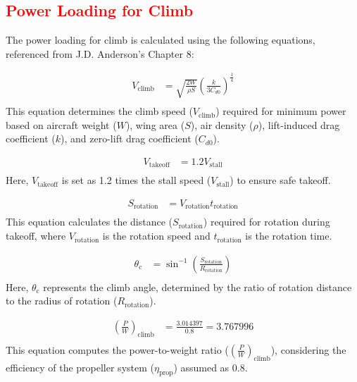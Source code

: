 \documentclass[12 pt]{article}
\begin{document}
\subsection{\textcolor{red}{Power Loading for Climb}}

The power loading for climb is calculated using the following equations, referenced from J.D. Anderson's Chapter 8:

\begin{align*}
V_{\text{climb}} &= \sqrt{\frac{2W}{\rho S}} \left(\frac{k}{3C_{d0}}\right)^{\frac{1}{4}} \tag{3.12} \\
\end{align*}
This equation determines the climb speed ($V_{\text{climb}}$) required for minimum power based on aircraft weight ($W$), wing area ($S$), air density ($\rho$), lift-induced drag coefficient ($k$), and zero-lift drag coefficient ($C_{d0}$).

\begin{align*}
V_{\text{takeoff}} &= 1.2 V_{\text{stall}} \tag{3.13} \\
\end{align*}
Here, $V_{\text{takeoff}}$ is set as 1.2 times the stall speed ($V_{\text{stall}}$) to ensure safe takeoff.

\begin{align*}
S_{\text{rotation}} &= V_{\text{rotation}} t_{\text{rotation}} \tag{3.14} \\
\end{align*}
This equation calculates the distance ($S_{\text{rotation}}$) required for rotation during takeoff, where $V_{\text{rotation}}$ is the rotation speed and $t_{\text{rotation}}$ is the rotation time.

\begin{align*}
\theta_{\text{c}} &= \sin^{-1}\left(\frac{S_{\text{rotation}}}{R_{\text{rotation}}}\right) \tag{3.15} \\
\end{align*}
Here, $\theta_{\text{c}}$ represents the climb angle, determined by the ratio of rotation distance to the radius of rotation ($R_{\text{rotation}}$).

\begin{align*}
\left(\frac{P}{W}\right)_{\text{climb}} &= \frac{3.014397}{0.8} = 3.767996 \tag{3.16} \\
\end{align*}
This equation computes the power-to-weight ratio ($\left(\frac{P}{W}\right)_{\text{climb}}$), considering the efficiency of the propeller system ($\eta_{\text{prop}}$) assumed as 0.8.
\end{document}
